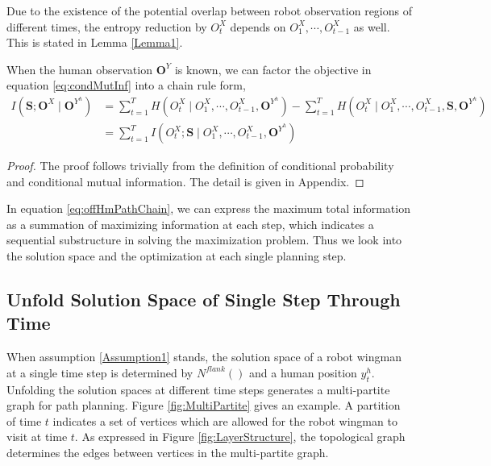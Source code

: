 \documentclass[12pt]{article}
\begin{document}
Due to the existence of the potential overlap between robot observation regions of different times, the entropy reduction by $ O^{X}_{t} $ depends on $ O^{X}_{1} , \cdots , O^{X}_{t-1} $ as well.
This is stated in Lemma \ref{Lemma1}.

\begin{lem} 
\label{Lemma1}
When the human observation $ \mathbf{O}^{Y} $ is known, we can factor the objective in equation \eqref{eq:condMutInf} into a chain rule form,
\begin{equation}
\label{eq:offHmPathChain}
\begin{aligned}
I(\mathbf{S}; \mathbf{O}^{X} \mid \mathbf{O}^{Y^{h}}) & = \sum_{t=1}^{T} H(O_{t}^{X} \mid O_{1}^{X} , \cdots , O_{t-1}^{X}, \mathbf{O}^{Y^{h}}) - \sum_{t=1}^{T} H(O_{t}^{X} \mid O_{1}^{X} , \cdots , O_{t-1}^{X}, \mathbf{S}, \mathbf{O}^{Y^{h}}) \\
& = \sum_{t=1}^{T} I(O^{X}_{t} ; \mathbf{S} \mid O^{X}_{1} , \cdots , O^{X}_{t-1}, \mathbf{O}^{Y^{h}})
\end{aligned}
\end{equation}
\begin{proof}
The proof follows trivially from the definition of conditional probability and conditional mutual information. 
The detail is given in Appendix.
\end{proof}
\end{lem}

In equation \eqref{eq:offHmPathChain}, we can express the maximum total information as a summation of maximizing information at each step, which indicates a sequential substructure in solving the maximization problem.
Thus we look into the solution space and the optimization at each single planning step.

\subsection{Unfold Solution Space of Single Step Through Time}
\label{subsec:unfold_solution_space}

When assumption \ref{Assumption1} stands, the solution space of a robot wingman at a single time step is determined by $ N^{flank}() $ and a human position $ y^{h}_{t} $. Unfolding the solution spaces at different time steps generates a multi-partite graph for path planning. Figure \ref{fig:MultiPartite} gives an example. A partition of time $ t $ indicates a set of vertices which are allowed for the robot wingman to visit at time $ t $. As expressed in Figure  \ref{fig:LayerStructure}, the topological graph determines the edges between vertices in the multi-partite graph.
\end{document}
